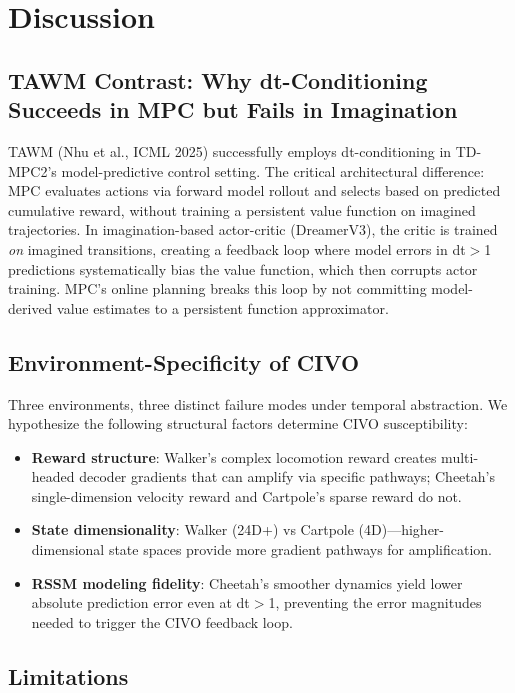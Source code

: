 \documentclass[10pt,letterpaper]{article}
\begin{document}
\section{Discussion}

\subsection{TAWM Contrast: Why dt-Conditioning Succeeds in MPC but Fails in Imagination}

TAWM (Nhu et al., ICML 2025) successfully employs dt-conditioning in TD-MPC2's model-predictive control setting. The critical architectural difference: MPC evaluates actions via forward model rollout and selects based on predicted cumulative reward, without training a persistent value function on imagined trajectories. In imagination-based actor-critic (DreamerV3), the critic is trained \emph{on} imagined transitions, creating a feedback loop where model errors in dt$>$1 predictions systematically bias the value function, which then corrupts actor training. MPC's online planning breaks this loop by not committing model-derived value estimates to a persistent function approximator.

\subsection{Environment-Specificity of CIVO}

Three environments, three distinct failure modes under temporal abstraction. We hypothesize the following structural factors determine CIVO susceptibility:
\begin{itemize}
    \item \textbf{Reward structure}: Walker's complex locomotion reward creates multi-headed decoder gradients that can amplify via specific pathways; Cheetah's single-dimension velocity reward and Cartpole's sparse reward do not.
    \item \textbf{State dimensionality}: Walker (24D+) vs Cartpole (4D)---higher-dimensional state spaces provide more gradient pathways for amplification.
    \item \textbf{RSSM modeling fidelity}: Cheetah's smoother dynamics yield lower absolute prediction error even at dt$>$1, preventing the error magnitudes needed to trigger the CIVO feedback loop.
\end{itemize}

\subsection{Limitations}
\end{document}
